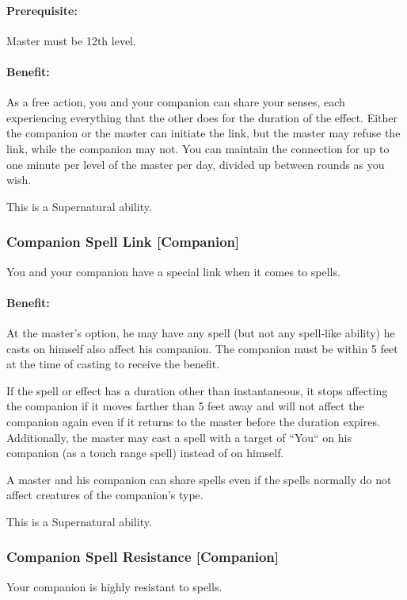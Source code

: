\paragraph{Prerequisite:} Master must be 12th level.

\paragraph{Benefit:} As a free action, you and your companion can share your senses, each experiencing everything that the other does for the duration of the effect.
Either the companion or the master can initiate the link, but the master may refuse the link, while the companion may not.
You can maintain the connection for up to one minute per level of the master per day, divided up between rounds as you wish. 

This is a Supernatural ability.
\subsubsection[Companion Spell Link]{Companion Spell Link [Companion]}
\label{Feat:CompanionSpellLink}
You and your companion have a special link when it comes to spells.

\paragraph{Benefit:} At the master's option, he may have any spell (but not any spell-like ability) he casts on himself also affect his companion. 
The companion must be within 5 feet at the time of casting to receive the benefit.

If the spell or effect has a duration other than instantaneous, 
it stops affecting the companion if it moves farther than 5 feet away and will not affect the companion again even if it returns to the master before the duration expires. 
Additionally, the master may cast a spell with a target of ``You`` on his companion (as a touch range spell) instead of on himself.

A master and his companion can share spells even if the spells normally do not affect creatures of the companion's type. 

This is a Supernatural ability.
\subsubsection[Companion Spell Resistance]{Companion Spell Resistance [Companion]}
\label{Feat:CompanionSpellResistance}
Your companion is highly resistant to spells.


